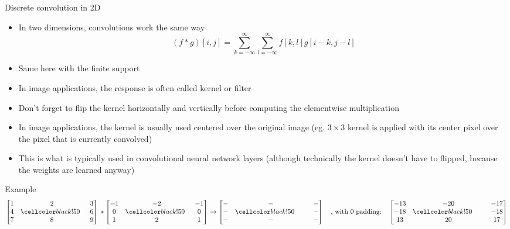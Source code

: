  \begin{frame}{Discrete convolution in 2D}
    \begin{itemize}
      \item In two dimensions, convolutions work the same way
        \begin{equation*}
          (f*g)[i, j] =
          \sum_{k=-\infty}^{\infty} \sum_{l=-\infty}^{\infty} f[k,l]g[i-k, j-l]
        \end{equation*}
      \item Same here with the finite support
      \item In image applications, the response is often called kernel or filter
      \item Don't forget to flip the kernel horizontally and vertically before
        computing the elementwise multiplication
      \item In image applications, the kernel is usually used centered over the original image (eg. $3\times 3$ kernel is applied with its center pixel over the pixel that is currently convolved)
      \item This is what is typically used in convolutional neural network layers (although technically the kernel doesn't have to flipped, because the weights are learned anyway)
    \end{itemize}
    \begin{exampleblock}{Example}
      \begin{equation*}
        \begin{bmatrix}
          1 & 2 & 3 \\ 4 & \ccga\tcw{5} & 6 \\ 7 & 8 & 9
        \end{bmatrix} \, *
        \begin{bmatrix}
          -1 & -2 & -1 \\ 0 & \ccga\tcw{0} & 0 \\ 1 & 2 & 1
        \end{bmatrix}  \rightarrow
        \begin{bmatrix}
          - & - & - \\ - & \ccga\tcw{-24} & - \\ - & - & -
        \end{bmatrix}\minter{, with $0$ padding:}
          \begin{bmatrix}
            -13 & -20 & -17 \\ -18 & \ccga\tcw{-24} & -18 \\ 13 & 20 & 17
          \end{bmatrix}
      \end{equation*}
    \end{exampleblock}
  \end{frame}

